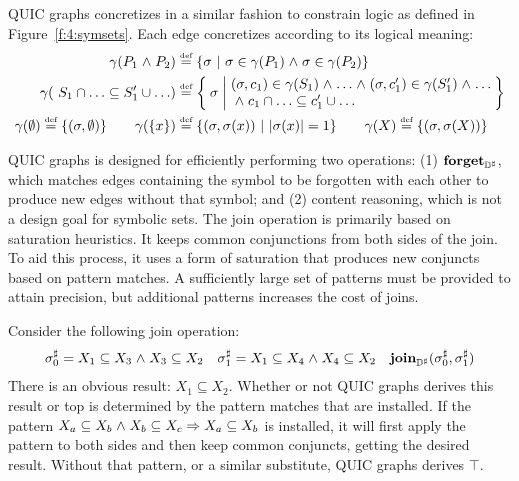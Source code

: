QUIC graphs concretizes in a similar fashion to constrain logic as defined
in Figure~\ref{f:4:symsets}.
Each edge concretizes according to its logical meaning:
\begin{align*}
  \gamma(P_1 \logand P_2) &\defeq \{ \state \ | \ \state \in \gamma(P_1) \logand \state \in \gamma(P_2) \} \\
  \gamma(\ S_1 \cap \ldots \subseteq S'_1 \cup \ldots) &\defeq \Set{ \state | \begin{array}{@{}l@{}}
       (\state,c_1) \in \gamma(S_1) \logand \ldots \logand (\state,c'_1) \in \gamma(S'_1) \logand \ldots \\
       {} \logand c_1 \cap \ldots \subseteq c'_1 \cup \ldots
    \end{array}
  } \\
  \gamma(\emptyset) \defeq \{ (\state, \emptyset) \}
  \qquad \gamma(\{x\}) &\defeq \{ (\state, \state(x)) \ | \ |\state(x)| = 1 \} \qquad \gamma(X) \defeq \{ (\state, \state(X)) \}
\end{align*}

QUIC graphs is designed for efficiently performing two operations: (1) $\textbf{forget}_{{\mathbb{D}}^{\sharp}}$, which matches edges containing the symbol to be forgotten with each other to produce new edges without that symbol; and (2) content reasoning, which is not a design goal for symbolic sets.  The join operation is primarily based on saturation heuristics.  It keeps common conjunctions from both sides of the join.  To aid this process, it uses a form of saturation that produces new conjuncts based on pattern matches.  A sufficiently large set of patterns must be provided to attain precision, but additional patterns increases the cost of joins.
\begin{example} \label{ex:Qjoin}  Consider the following join operation:
    \begin{align*}
      {\sigma}^{\sharp}_0 &= X_1 \subseteq X_3 \mathrel{\wedge} X_3 \subseteq X_2 &
      {\sigma}^{\sharp}_1 &= X_1 \subseteq X_4 \mathrel{\wedge} X_4 \subseteq X_2 &
      \textbf{join}_{{\mathbb{D}}^{\sharp}}({\sigma}^{\sharp}_0, {\sigma}^{\sharp}_1 )
    \end{align*}
    There is an obvious result: $X_1 \subseteq X_2$.  Whether or not QUIC graphs derives this result or top is determined by the pattern matches that are installed.  If the pattern $X_a \subseteq X_b \mathrel{\wedge} X_b \subseteq X_c \Rightarrow X_a \subseteq X_b$ is installed, it will first apply the pattern to both sides and then keep common conjuncts, getting the desired result.  Without that pattern, or a similar substitute, QUIC graphs derives $\top$.
\end{example}


